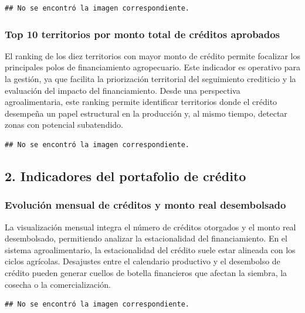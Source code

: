 \documentclass[
]{article}
\begin{document}
\begin{verbatim}
## No se encontró la imagen correspondiente.
\end{verbatim}

\subsubsection{Top 10 territorios por monto total de créditos
aprobados}\label{top-10-territorios-por-monto-total-de-cruxe9ditos-aprobados}

El ranking de los diez territorios con mayor monto de crédito permite
focalizar los principales polos de financiamiento agropecuario. Este
indicador es operativo para la gestión, ya que facilita la priorización
territorial del seguimiento crediticio y la evaluación del impacto del
financiamiento. Desde una perspectiva agroalimentaria, este ranking
permite identificar territorios donde el crédito desempeña un papel
estructural en la producción y, al mismo tiempo, detectar zonas con
potencial subatendido.

\begin{verbatim}
## No se encontró la imagen correspondiente.
\end{verbatim}

\subsection{2. Indicadores del portafolio de
crédito}\label{indicadores-del-portafolio-de-cruxe9dito}

\subsubsection{Evolución mensual de créditos y monto real
desembolsado}\label{evoluciuxf3n-mensual-de-cruxe9ditos-y-monto-real-desembolsado}

La visualización mensual integra el número de créditos otorgados y el
monto real desembolsado, permitiendo analizar la estacionalidad del
financiamiento. En el sistema agroalimentario, la estacionalidad del
crédito suele estar alineada con los ciclos agrícolas. Desajustes entre
el calendario productivo y el desembolso de crédito pueden generar
cuellos de botella financieros que afectan la siembra, la cosecha o la
comercialización.

\begin{verbatim}
## No se encontró la imagen correspondiente.
\end{verbatim}
\end{document}
